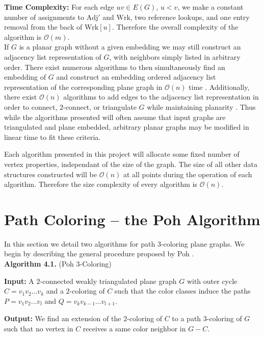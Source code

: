 \documentclass[letterpaper, 12pt]{article}
\theoremstyle{definition}
\theoremstyle{definition}
\theoremstyle{thm}
\theoremstyle{definition}
\begin{document}
\noindent\textbf{Time Complexity:} For each edge $uv\in E(G)$, $u<v$, we make a
constant number of assignments to $\text{Adj}'$ and $\text{Wrk}$, two reference
lookups, and one entry removal from the back of $\text{Wrk}[u]$.
Therefore the overall complexity of the algorithm is $\mathcal{O}(m)$.\\

If $G$ is a planar graph without a given embedding we may still construct an
adjacency list representation of $G$, with neighbors simply listed in arbitrary
order. There exist numerous algorithms to then simultaneously find an embedding
of $G$ and construct an embedding ordered adjacency list representation of the
corresponding plane graph in $\mathcal{O}(n)$ time \cite{tarjan, lempel, boyer,
booth}. Additionally, there exist $\mathcal{O}(n)$ algorithms to add edges
to the adjacency list representation in order to connect, $2$-connect, or
triangulate $G$ while maintaining planarity \cite{hagerup,reed,eswaran}.
Thus while the algorithms presented will often assume that input graphs are
triangulated and plane embedded, arbitrary planar graphs may be modified in
linear time to fit these criteria.

Each algorithm presented in this project will allocate some fixed number
of vertex properties, independant of the size of the graph. The size of all
other data structures constructed will be $\mathcal{O}(n)$ at all points during
the operation of each algorithm. Therefore the size complexity of every
algorithm is $\mathcal{O}(n)$.


\section{Path Coloring -- the Poh Algorithm}

In this section we detail two algorithms for path $3$-coloring plane graphs. We
begin by describing the general procedure proposed by Poh \cite{poh}.\\

\noindent\textbf{Algorithm 4.1.} (Poh $3$-Coloring)

\noindent\textbf{Input:} A $2$-connected weakly triangulated plane graph $G$
with outer cycle $C=v_1v_2\ldots v_k$ and a $2$-coloring of $C$ such that the
color classes induce the paths $P=v_1v_2\ldots v_l$ and
$Q=v_{k}v_{k-1}\ldots v_{l+1}$.

\noindent\textbf{Output:} We find an extension of the $2$-coloring of $C$ to
a path $3$-coloring of $G$ such that no vertex in $C$ receives a same color
neighbor in $G-C$.
\end{document}
